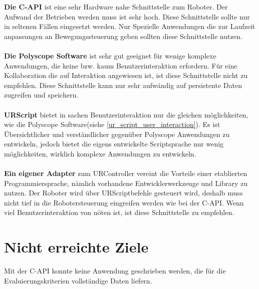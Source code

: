 \textbf{Die C-API} ist eine sehr Hardware nahe Schnittstelle zum Roboter. Der Aufwand der Betrieben werden muss ist sehr hoch. Diese Schnittstelle sollte nur in seltenen Fällen eingesetzt werden. Nur Spezielle Anwendungen die zur Laufzeit anpassungen an Bewegungssteuerung geben sollten diese Schnittstelle nutzen.
\\\\
\textbf{Die Polyscope Software} ist sehr gut geeignet für wenige komplexe Anwendungen, die keine bzw. kaum Benutzerinteraktion erfordern. Für eine Kollaboration die auf Interaktion angewiesen ist, ist diese Schnittstelle nicht zu empfehlen. Diese Schnittstelle kann nur sehr aufwändig auf persistente Daten zugreifen und speichern.
\\\\
\textbf{URScript} bietet in sachen Benutzerinteraktion nur die gleichen möglichkeiten, wie die Polyscope Software(siehe \ref{ur_script_user_interaction}). Es ist Übersichtlicher und verständlicher gegenüber Polyscope Anwendungen zu entwickeln, jedoch bietet die eigens entwickelte Scriptsprache nur wenig möglichkeiten, wirklich komplexe Anwendungen zu entwickeln.
\\\\
\textbf{Ein eigener Adapter} zum URController vereint die Vorteile einer etablierten Programmiersprache, nämlich vorhandene Entwicklerwerkzeuge und \acl{Library} zu nutzen. Der Roboter wird über URScriptbefehle gesteuert wird, deshalb muss nicht tief in die Robotersteuerung eingreifen werden wie bei der C-API. Wenn viel Benutzerinteraktion von nöten ist, ist diese Schnittstelle zu empfehlen.

\section{Nicht erreichte Ziele}
\label{sec:Nicht_erreichte_ziele}

Mit der C-API konnte keine Anwendung geschrieben werden, die für die Evaluierungskriterien vollständige Daten liefern.